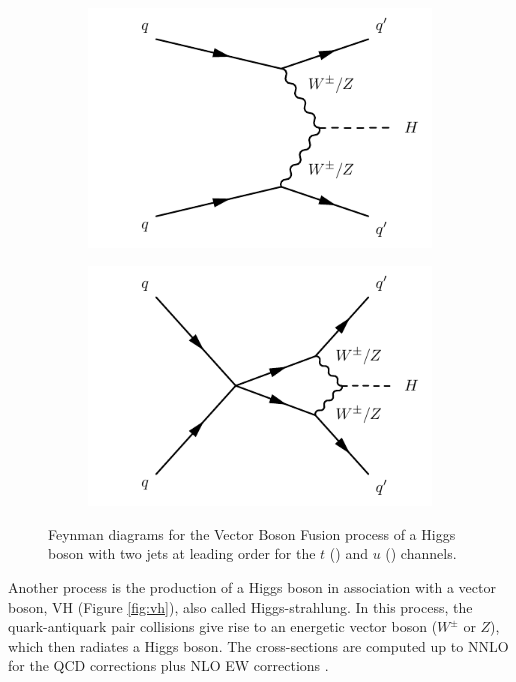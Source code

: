 \begin{figure}
\centering
\begin{subfigure}[b]{0.5\textwidth}
  \centering
  \includegraphics[width=\textwidth]{Images/VBF1.pdf}
  \caption{\label{fig:vbf1}}
\end{subfigure}%
\begin{subfigure}[b]{0.5\textwidth}
  \centering
  \includegraphics[width=\textwidth]{Images/VBF2.pdf}
  \caption{\label{fig:vbf2}}
\end{subfigure}
\caption{Feynman diagrams for the Vector Boson Fusion process of a Higgs boson with two jets at leading order for the $t$ () and $u$ () channels.}
\label{fig:vbf}
\end{figure}


Another process is the production of a Higgs boson in association with a vector boson, VH (Figure \ref{fig:vh}), also called Higgs-strahlung. In this process, the quark-antiquark pair collisions give rise to an energetic vector boson ($W^{\pm}$ or $Z$), which then radiates a Higgs boson. The cross-sections are computed up to NNLO for the QCD corrections plus NLO EW corrections \cite{deFlorian:2227475}.


